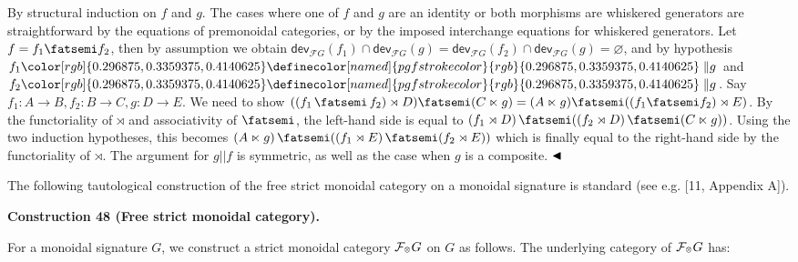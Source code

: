  
By structural induction on $f$ and $g$. The cases where one of $f$ and $g$ are an identity or both morphisms are whiskered generators are straightforward by the equations of premonoidal categories, or by the imposed interchange equations for whiskered generators. Let $f=f_{1}{\mathop{\fatsemi}}f_{2}$, then by assumption we obtain $\mathsf{dev}_{\mathcal{F}G}(f_{1})\cap\mathsf{dev}_{\mathcal{F}G}(g)=\mathsf{dev}_{\mathcal{F}G}(f_{2})\cap\mathsf{dev}_{\mathcal{F}G}(g)=\varnothing$, and by hypothesis $f_{1}{\color[rgb]{0.296875,0.3359375,0.4140625}\definecolor[named]{pgfstrokecolor}{rgb}{0.296875,0.3359375,0.4140625}\parallel}g$ and $f_{2}{\color[rgb]{0.296875,0.3359375,0.4140625}\definecolor[named]{pgfstrokecolor}{rgb}{0.296875,0.3359375,0.4140625}\parallel}g$. Say $f_{1}:A\to B,f_{2}:B\to C,g:D\to E$. We need to show $((f_{1}\mathop{\fatsemi}f_{2})\rtimes D){\mathop{\fatsemi}}(C\ltimes g)=(A\ltimes g){\mathop{\fatsemi}}((f_{1}{\mathop{\fatsemi}}f_{2})\rtimes E)$. By the functoriality of $\rtimes$ and associativity of $\mathop{\fatsemi}$, the left-hand side is equal to $(f_{1}\rtimes D)\mathop{\fatsemi}((f_{2}\rtimes D)\mathop{\fatsemi}(C\ltimes g))$. Using the two induction hypotheses, this becomes $(A\ltimes g)\mathop{\fatsemi}((f_{1}\rtimes E)\mathop{\fatsemi}(f_{2}\rtimes E))$ which is finally equal to the right-hand side by the functoriality of $\rtimes$. The argument for $g||f$ is symmetric, as well as the case when $g$ is a composite. $\hfill\blacktriangleleft$\par
 
 
 
The following tautological construction of the free strict monoidal category on a monoidal signature is standard (see e.g. [11, Appendix A]).\par
 
 
 
\par\medskip\noindent\textbf{Construction 48 (Free strict monoidal category).}\par
 
 
For a monoidal signature $G$, we construct a strict monoidal category $\mathcal{F}_{\mathbin{\raisebox{1.25pt}{$\scriptscriptstyle\otimes$}}}G$ on $G$ as follows. The underlying category of $\mathcal{F}_{\mathbin{\raisebox{1.25pt}{$\scriptscriptstyle\otimes$}}}G$ has:\par
  
